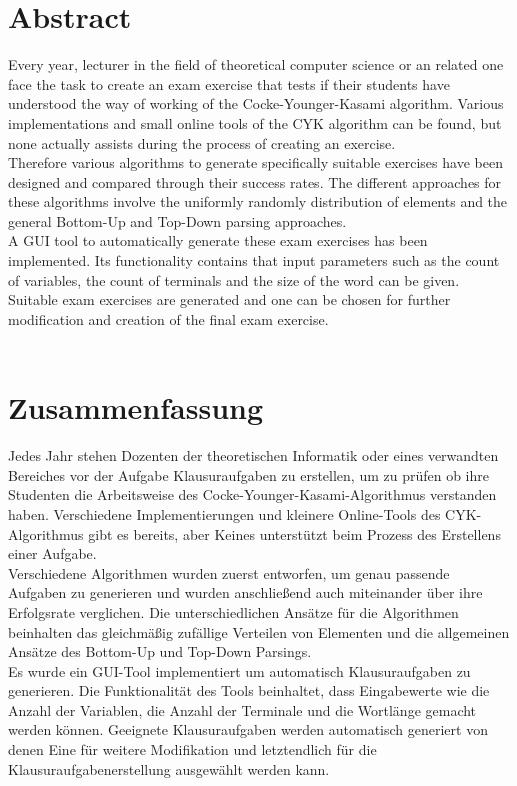 \section*{Abstract}\label{abtract}
Every year, lecturer in the field of theoretical computer science or an related one face the task to create an exam exercise that tests if their students have understood the way of working of the Cocke-Younger-Kasami algorithm. Various implementations and small online tools of the CYK algorithm can be found, but none actually assists during the process of creating an exercise.\\
Therefore various algorithms to generate specifically suitable exercises have been designed and compared through their success rates. The different approaches for these algorithms involve the uniformly randomly distribution of elements and the general Bottom-Up and Top-Down parsing approaches.\\
A GUI tool to automatically generate these exam exercises has been implemented. Its functionality contains that input parameters such as the count of variables, the count of terminals and the size of the word can be given. Suitable exam exercises are generated and one can be chosen for further modification and creation of the final exam exercise.\\


~~

\section*{Zusammenfassung}\label{zusammenfassung}
Jedes Jahr stehen Dozenten der theoretischen Informatik oder eines verwandten Bereiches vor der Aufgabe Klausuraufgaben zu erstellen, um zu prüfen ob ihre Studenten die Arbeitsweise des Cocke-Younger-Kasami-Algorithmus verstanden haben. Verschiedene Implementierungen und kleinere Online-Tools des CYK-Algorithmus gibt es bereits, aber Keines unterstützt beim Prozess des Erstellens einer Aufgabe.\\
Verschiedene Algorithmen wurden zuerst entworfen, um genau passende Aufgaben zu generieren und wurden anschließend auch miteinander über ihre Erfolgsrate verglichen. Die unterschiedlichen Ansätze für die Algorithmen beinhalten das gleichmäßig zufällige Verteilen von Elementen und die allgemeinen Ansätze des Bottom-Up und Top-Down Parsings.\\
Es wurde ein GUI-Tool implementiert um automatisch Klausuraufgaben zu generieren. Die Funktionalität des Tools beinhaltet, dass Eingabewerte wie die Anzahl der Variablen, die Anzahl der Terminale und die Wortlänge gemacht werden können. Geeignete Klausuraufgaben werden automatisch generiert von denen Eine für weitere Modifikation und letztendlich für die Klausuraufgabenerstellung ausgewählt werden kann.\\



\pagebreak

